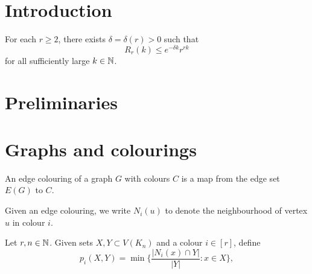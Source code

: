 \section{Introduction}

\begin{theorem}\label{thm:Ramsey:multicolour}
  For each $r \ge 2$, there exists $\delta = \delta(r) > 0$ such that 
  \begin{equation*}
    R_r(k) \le e^{-\delta k} r^{rk}
  \end{equation*} 
  for all sufficiently large $k \in \mathbb{N}$. 
\end{theorem}


\section{Preliminaries}

\section{Graphs and colourings}

\begin{definition}
  \label{def:edge-colouring}
  \leanok
  An edge colouring of a graph $G$ with colours $C$ is a map from the edge set $E(G)$ to $C$.
\end{definition}

\begin{definition}
  \label{def:colour-neighborhood}
  \leanok
  Given an edge colouring, we write $N_i(u)$ to denote the neighbourhood of vertex $u$ in colour $i$.
\end{definition}

\begin{definition}
  \label{def:p}
  Let $r, n\in\mathbb{N}$. Given sets $X,Y \subset V(K_n)$ and a colour $i \in [r]$, define
  $$p_i(X,Y) = \min\bigg\{ \frac{|N_i(x) \cap Y|}{|Y|} : x \in X \bigg\},$$
\end{definition}


